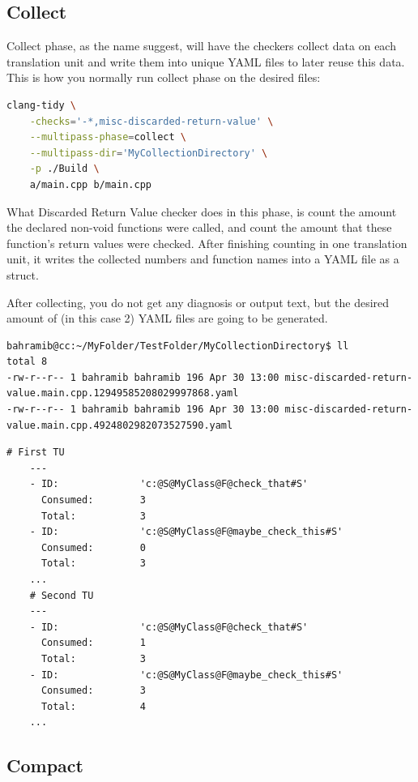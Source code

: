 \subsection{Collect}

Collect phase, as the name suggest, will have the checkers collect data on each translation unit and write them into unique YAML
files to later reuse this data. This is how you normally run collect phase on the desired files:

\begin{lstlisting}[language={bash}]
	clang-tidy \
	-checks='-*,misc-discarded-return-value' \
	--multipass-phase=collect \
	--multipass-dir='MyCollectionDirectory' \
	-p ./Build \
	a/main.cpp b/main.cpp
\end{lstlisting}

What Discarded Return Value checker does in this phase, is count the amount the declared non-void functions were called,
and count the amount that these function's return values were checked. After finishing counting in one translation unit, it writes the
collected numbers and function names into a YAML file as a struct.  
\par After collecting, you do not get any diagnosis or output text, but the desired amount of (in this case 2) YAML files are going to
be generated.

\begin{lstlisting}[caption={The YAML files containing the collection data.},captionpos=b]
bahramib@cc:~/MyFolder/TestFolder/MyCollectionDirectory$ ll
total 8
-rw-r--r-- 1 bahramib bahramib 196 Apr 30 13:00 misc-discarded-return-value.main.cpp.12949585208029997868.yaml
-rw-r--r-- 1 bahramib bahramib 196 Apr 30 13:00 misc-discarded-return-value.main.cpp.4924802982073527590.yaml
\end{lstlisting}

\begin{lstlisting}[caption={Contents of the collection files.},captionpos=b]
	# First TU
	---
	- ID:              'c:@S@MyClass@F@check_that#S'
	  Consumed:        3
	  Total:           3
	- ID:              'c:@S@MyClass@F@maybe_check_this#S'
	  Consumed:        0
	  Total:           3
	...
	# Second TU
	---
	- ID:              'c:@S@MyClass@F@check_that#S'
	  Consumed:        1
	  Total:           3
	- ID:              'c:@S@MyClass@F@maybe_check_this#S'
	  Consumed:        3
	  Total:           4
	...
\end{lstlisting}

\subsection{Compact}

